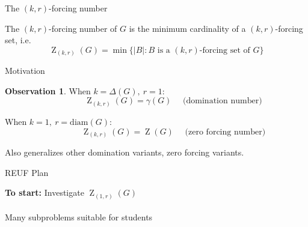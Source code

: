 \documentclass{beamer}
\theoremstyle{definition}
\newtheorem{observation}{Observation}
\DeclareMathOperator{\Z}{Z}
\begin{document}
\begin{frame}{The $(k,r)$-forcing number}
\begin{definition}
    The $(k,r)$-forcing number of $G$ is the minimum cardinality of a $(k,r)$-forcing set, i.e.
    \[ \Z_{(k,r)}(G) = \min \{ |B| : B\text{ is a } (k,r)\text{-forcing set of } G \}
    \]
\end{definition}
    
\end{frame}

\begin{frame}{Motivation}
    \begin{observation}
    When $k=\Delta(G), \ r=1$:
        \[\qquad \qquad \Z_{(k,r)}(G) = \gamma(G)\quad \text{  (domination number)}\]\vspace{.05in}

    When $k=1, \ r=\mathrm{diam}(G)$:
    \[\qquad \qquad \Z_{(k,r)}(G) = \Z(G) \quad \text{  (zero forcing number)}\]
    \end{observation}
\vspace{.25in}
    Also generalizes other domination variants, zero forcing variants.
\end{frame}


\begin{frame}{REUF Plan}
    \begin{center}
        \textbf{To start:} Investigate $\Z_{(1,r)}(G)$ \\~\\

        Many subproblems suitable for students
    \end{center}
\end{frame}

   
    
\end{document}
